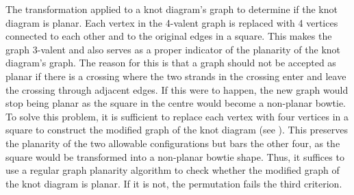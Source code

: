 \begin{paper}
{The transformation applied to a knot diagram's graph to determine if the knot
diagram is planar.
Each vertex in the 4-valent graph is replaced with 4 vertices connected to each
other and to the original edges in a square.
This makes the graph 3-valent and also serves as a proper indicator of the
planarity of the knot diagram's graph.
The reason for this is that a graph should not be accepted as planar if there is
a crossing where the two strands in the crossing enter and leave the crossing
through adjacent edges.
If this were to happen, the new graph would stop being planar as the square in
the centre would become a non-planar bowtie.}\\

To solve this problem, it is sufficient to replace each vertex with four
vertices in a square to construct the modified graph of the knot diagram (see
\figGraph).
This preserves the planarity of the two allowable configurations but bars the
other four, as the square would be transformed into a non-planar bowtie shape.
Thus, it suffices to use a regular graph planarity algorithm to check whether
the modified graph of the knot diagram is planar.
If it is not, the permutation fails the third criterion.

\noindent{}

\noindent{}


\end{paper}
